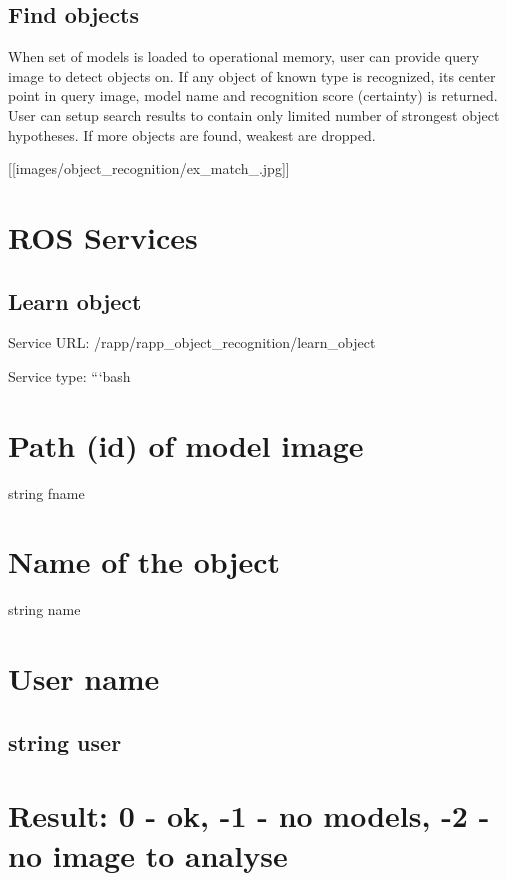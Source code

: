 \subsection*{Find objects}

When set of models is loaded to operational memory, user can provide query image to detect objects on. If any object of known type is recognized, its center point in query image, model name and recognition score (certainty) is returned. User can setup search results to contain only limited number of strongest object hypotheses. If more objects are found, weakest are dropped.

\mbox{[}\mbox{[}images/object\-\_\-recognition/ex\-\_\-match\-\_.\-jpg\mbox{]}\mbox{]}

\section*{R\-O\-S Services}

\subsection*{Learn object}

Service U\-R\-L\-: {\ttfamily /rapp/rapp\-\_\-object\-\_\-recognition/learn\-\_\-object}

Service type\-: ```bash \section*{Path (id) of model image}

string fname \section*{Name of the object}

string name \section*{User name}

\subsection*{string user }

\section*{Result\-: 0 -\/ ok, -\/1 -\/ no models, -\/2 -\/ no image to analyse}

